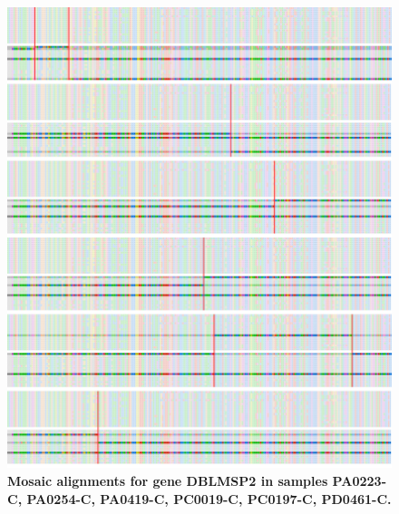 \documentclass[12pt]{article}
\begin{document}
\begin{figure}
    \centering
    \centerline{\includegraphics[width=1.2\textwidth]{DBLMSP2_PA0223-C_PA0254-C_PA0419-C_PC0019-C_PC0197-C_PD0461-C.png}}
    \caption[Mosaic alignments (6)]{
        \textbf{Mosaic alignments for gene DBLMSP2 in samples PA0223-C, PA0254-C,
        PA0419-C, PC0019-C, PC0197-C, PD0461-C.}
        }
    \label{pa:fig:mosaic_app6}
\end{figure}
\end{document}
